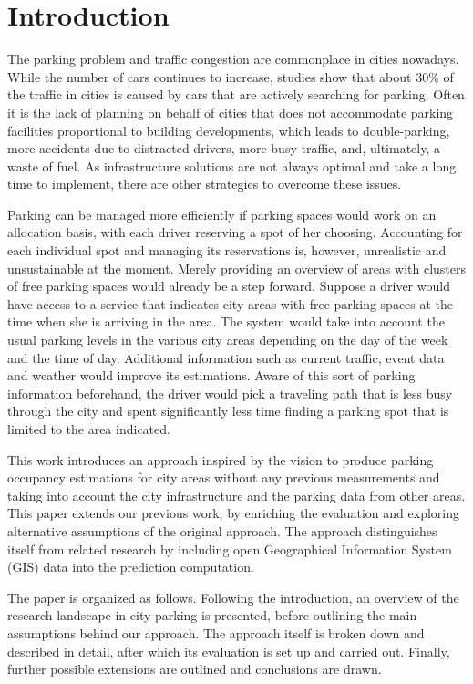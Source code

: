 \section{Introduction}
	The parking problem and traffic congestion are commonplace in cities nowadays. While the number of cars continues to increase\cite{car_increase}, studies show that about 30\% of the traffic in cities is caused by cars that are actively searching for parking\cite{traffic_congestion}. Often it is the lack of planning on behalf of cities that does not accommodate parking facilities proportional to building developments, which leads to double-parking, more accidents due to distracted drivers, more busy traffic, and, ultimately, a waste of fuel\cite{inrix_study}. As infrastructure solutions are not always optimal and take a long time to implement, there are other strategies to overcome these issues.
	
	Parking can be managed more efficiently if parking spaces would work on an allocation basis, with each driver reserving a spot of her choosing. Accounting for each individual spot and managing its reservations is, however, unrealistic and unsustainable at the moment. Merely providing an overview of areas with clusters of free parking spaces would already be a step forward. Suppose a driver would have access to a service that indicates city areas with free parking spaces at the time when she is arriving in the area. The system would take into account the usual parking levels in the various city areas depending on the day of the week and the time of day. Additional information such as current traffic, event data and weather would improve its estimations. Aware of this sort of parking information beforehand, the driver would pick a traveling path that is less busy through the city and spent significantly less time finding a parking spot that is limited to the area indicated.
	
	This work introduces an approach inspired by the vision to produce parking occupancy estimations for city areas without any previous measurements and taking into account the city infrastructure and the parking data from other areas. This paper extends our previous work\cite{ionita2018park}, by enriching the evaluation and exploring alternative assumptions of the original approach. The approach distinguishes itself from related research by including open Geographical Information System (GIS) data into the prediction computation.
	
	The paper is organized as follows. Following the introduction, an overview of the research landscape in city parking is presented, before outlining the main assumptions behind our approach. The approach itself is broken down and described in detail, after which its evaluation is set up and carried out. Finally, further possible extensions are outlined and conclusions are drawn.

